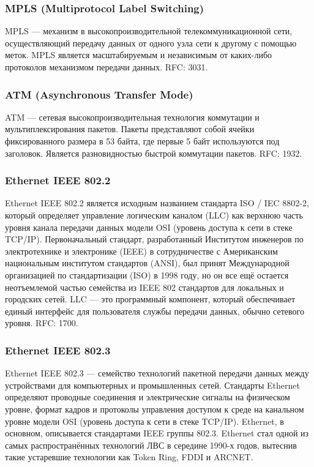 \subsubsection{MPLS (Multiprotocol Label Switching)}
MPLS — механизм в высокопроизводительной телекоммуникационной сети,
осуществляющий передачу данных от одного узла сети к другому с помощью меток. MPLS
является масштабируемым и независимым от каких-либо протоколов механизмом передачи
данных. RFC: 3031.

\subsubsection{ATM (Asynchronous Transfer Mode)}
ATM — сетевая высокопроизводительная технология коммутации и мультиплексирования
пакетов. Пакеты представляют собой ячейки фиксированного размера в 53 байта, где первые
5 байт используются под заголовок. Является разновидностью быстрой коммутации пакетов.
RFC: 1932.

\subsubsection{Ethernet IEEE 802.2}
Ethernet IEEE 802.2 является исходным названием стандарта ISO / IEC 8802-2, который
определяет управление логическим каналом (LLC) как верхнюю часть уровня канала передачи
данных модели OSI (уровень доступа к сети в стеке TCP/IP). Первоначальный стандарт,
разработанный Институтом инженеров по электротехнике и электронике (IEEE) в
сотрудничестве с Американским национальным институтом стандартов (ANSI), был принят
Международной организацией по стандартизации (ISO) в 1998 году, но он все ещё остается
неотъемлемой частью семейства из IEEE 802 стандартов для локальных и городских сетей. LLC
— это программный компонент, который обеспечивает единый интерфейс для пользователя
службы передачи данных, обычно сетевого уровня. RFC: 1700.

\subsubsection{Ethernet IEEE 802.3}
Ethernet IEEE 802.3 — семейство технологий пакетной передачи данных между
устройствами для компьютерных и промышленных сетей. Стандарты Ethernet определяют
проводные соединения и электрические сигналы на физическом уровне, формат кадров и
протоколы управления доступом к среде на канальном уровне модели OSI (уровень доступа к
сети в стеке TCP/IP). Ethernet, в основном, описывается стандартами IEEE группы 802.3.
Ethernet стал одной из самых распространённых технологий ЛВС в середине 1990-х годов,
вытеснив такие устаревшие технологии как Token Ring, FDDI и ARCNET.

